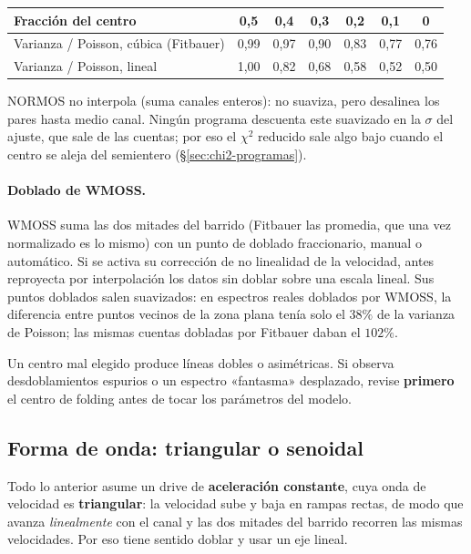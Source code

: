 \begin{center}
\begin{tabular}{@{}lcccccc@{}}
\toprule
Fracción del centro & 0,5 & 0,4 & 0,3 & 0,2 & 0,1 & 0 \\
\midrule
Varianza / Poisson, cúbica (Fitbauer) & 0,99 & 0,97 & 0,90 & 0,83 & 0,77 & 0,76 \\
Varianza / Poisson, lineal            & 1,00 & 0,82 & 0,68 & 0,58 & 0,52 & 0,50 \\
\bottomrule
\end{tabular}
\end{center}

\noindent NORMOS no interpola (suma canales enteros): no suaviza, pero desalinea
los pares hasta medio canal. Ningún programa descuenta este suavizado en la
$\sigma$ del ajuste, que sale de las cuentas; por eso el $\chi^2$ reducido sale
algo bajo cuando el centro se aleja del semientero (§\ref{sec:chi2-programas}).

\paragraph{Doblado de WMOSS.} WMOSS suma las dos mitades del barrido (Fitbauer
las promedia, que una vez normalizado es lo mismo) con un punto de doblado
fraccionario, manual o automático. Si se activa su corrección de no linealidad
de la velocidad, antes reproyecta por interpolación los datos sin doblar sobre
una escala lineal. Sus puntos doblados salen suavizados: en espectros reales
doblados por WMOSS, la diferencia entre puntos vecinos de la zona plana tenía
solo el $38\%$ de la varianza de Poisson; las mismas cuentas dobladas por
Fitbauer daban el $102\%$.

\begin{aviso}
Un centro mal elegido produce líneas dobles o asimétricas. Si observa
desdoblamientos espurios o un espectro «fantasma» desplazado, revise
\textbf{primero} el centro de folding antes de tocar los parámetros del modelo.
\end{aviso}

\subsection{Forma de onda: triangular o senoidal}
\label{sec:drive-form}

Todo lo anterior asume un drive de \textbf{aceleración constante}, cuya onda de
velocidad es \textbf{triangular}: la velocidad sube y baja en rampas rectas, de
modo que avanza \emph{linealmente} con el canal y las dos mitades del barrido
recorren las mismas velocidades. Por eso tiene sentido doblar y usar un eje
lineal.

